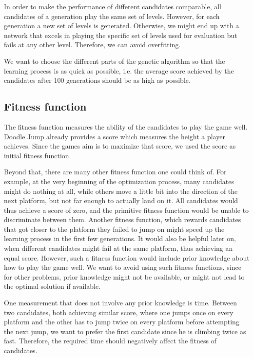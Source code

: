 \documentclass[a4paper,12pt,pagesize,headsepline,bibtotoc,titlepage,abstracton]{scrartcl}
\begin{document}
In order to make the performance of different candidates comparable, all candidates of a generation play the same set of levels. However, for each generation a new set of levels is generated. Otherwise, we might end up with a network that excels in playing the specific set of levels used for evaluation but fails at any other level. Therefore, we can avoid overfitting.

We want to choose the different parts of the genetic algorithm so that the learning process is as quick as possible, i.e. the average score achieved by the candidates after 100 generations should be as high as possible.

\subsection{Fitness function}

The fitness function measures the ability of the candidates to play the game well. Doodle Jump already provides a score which measures the height a player achieves. Since the games aim is to maximize that score, we used the score as initial fitness function.

Beyond that, there are many other fitness function one could think of. For example, at the very beginning of the optimization process, many candidates might do nothing at all, while others move a little bit into the direction of the next platform, but not far enough to actually land on it. All candidates would thus achieve a score of zero, and the primitive fitness function would be unable to discriminate between them. Another fitness function, which rewards candidates that got closer to the platform they failed to jump on might speed up the learning process in the first few generations. It would also be helpful later on, when different candidates might fail at the same platform, thus achieving an equal score. However, such a fitness function would include prior knowledge about how to play the game well. We want to avoid using such fitness functions, since for other problems, prior knowledge might not be available, or might not lead to the optimal solution if available. 

One measurement that does not involve any prior knowledge is time. Between two candidates, both achieving similar score, where one jumps once on every platform and the other has to jump twice on every platform before attempting the next jump, we want to prefer the first candidate since he is climbing twice as fast. Therefore, the required time should negatively affect the fitness of candidates.
\end{document}
